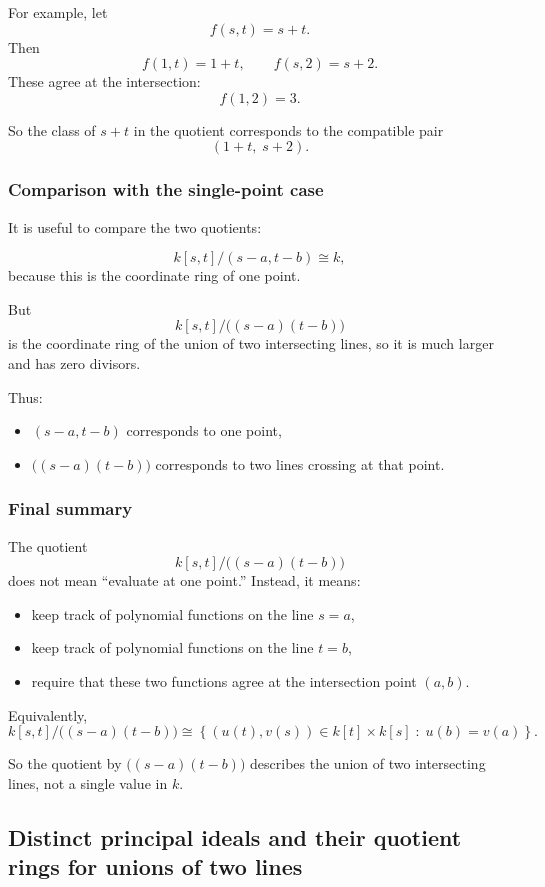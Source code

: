 \documentclass[12pt,a4paper]{article}
\theoremstyle{notespace}
\theoremstyle{definition}
\begin{document}
For example, let
\[
f(s,t)=s+t.
\]
Then
\[
f(1,t)=1+t,
\qquad
f(s,2)=s+2.
\]
These agree at the intersection:
\[
f(1,2)=3.
\]

So the class of \(s+t\) in the quotient corresponds to the compatible pair
\[
(1+t,\; s+2).
\]

\subsubsection{Comparison with the single-point case}

It is useful to compare the two quotients:

\[
k[s,t]/(s-a,t-b)\cong k,
\]
because this is the coordinate ring of one point.

But
\[
k[s,t]\big/\bigl((s-a)(t-b)\bigr)
\]
is the coordinate ring of the union of two intersecting lines, so it is much larger and has zero divisors.

Thus:

\begin{itemize}
	\item \((s-a,t-b)\) corresponds to one point,
	\item \(\bigl((s-a)(t-b)\bigr)\) corresponds to two lines crossing at that point.
\end{itemize}

\subsubsection{Final summary}

The quotient
\[
k[s,t]\big/\bigl((s-a)(t-b)\bigr)
\]
does not mean ``evaluate at one point.'' Instead, it means:

\begin{itemize}
	\item keep track of polynomial functions on the line \(s=a\),
	\item keep track of polynomial functions on the line \(t=b\),
	\item require that these two functions agree at the intersection point \((a,b)\).
\end{itemize}

Equivalently,
\[
k[s,t]\big/\bigl((s-a)(t-b)\bigr)
\cong
\left\{(u(t),v(s))\in k[t]\times k[s]\;:\; u(b)=v(a)\right\}.
\]

So the quotient by \(\bigl((s-a)(t-b)\bigr)\) describes the union of two intersecting lines, not a single value in \(k\).


\subsection{Distinct principal ideals and their quotient rings for unions of two lines}
\end{document}
